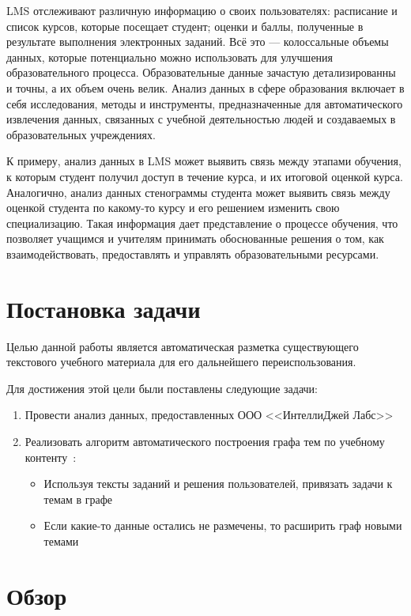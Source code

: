 \documentclass[14pt]{matmex-diploma-custom}
\begin{document}
LMS отслеживают различную информацию о своих пользователях:  расписание и список курсов, которые посещает студент; оценки и баллы, полученные в результате выполнения электронных заданий. Всё это --- колоссальные объемы данных, которые потенциально можно использовать для улучшения образовательного процесса. Образовательные данные зачастую детализированны и точны, а их объем очень велик. Анализ данных в сфере образования включает в себя исследования, методы и инструменты, предназначенные для автоматического извлечения данных, связанных с учебной деятельностью людей и создаваемых в образовательных учреждениях.

К примеру, анализ данных в LMS может выявить связь между этапами обучения, к которым студент получил доступ в течение курса, и их итоговой оценкой курса. Аналогично, анализ данных стенограммы студента может выявить связь между оценкой студента по какому-то курсу и его решением изменить свою специализацию. Такая информация дает представление о процессе обучения, что позволяет учащимся и учителям принимать обоснованные решения о том, как взаимодействовать, предоставлять и управлять образовательными ресурсами.

\section{Постановка задачи}
Целью данной работы является автоматическая разметка существующего текстового учебного материала для его дальнейшего переиспользования.

Для достижения этой цели были поставлены следующие задачи: 

\begin{enumerate}
    \item Провести анализ данных, предоставленных ООО <<ИнтеллиДжей Лабс>>~\cite{jetbrains}
    \item Реализовать алгоритм автоматического построения графа тем по учебному контенту~\cite{themegraph}:
    \begin{itemize}
        \item Используя тексты заданий и решения пользователей, привязать задачи к темам в графе
        \item Если какие-то данные остались не размечены, то расширить граф новыми темами %
    \end{itemize}
\end{enumerate}

\section{Обзор}
\end{document}

